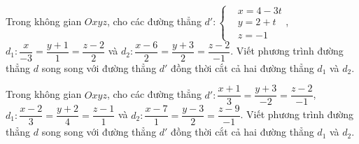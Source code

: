 \begin{bt}%
	Trong không gian $Oxyz$, cho các đường thẳng $d':\left\{\begin{aligned}&x=4-3t\\&y=2+t\\&z=-1\end{aligned}\right.$,\newline $d_1:\dfrac{x}{-3}=\dfrac{y+1}{1}=\dfrac{z-2}{2}$ và $d_2:\dfrac{x-6}{2}=\dfrac{y+3}{2}=\dfrac{z-2}{-1}$. Viết phương trình đường thẳng $d$ song song với đường thẳng $d'$ đồng thời cắt cả hai đường thẳng $d_1$ và $d_2$.
\end{bt}
\begin{bt}%
	Trong không gian $Oxyz$, cho các đường thẳng $d':\dfrac{x+1}{3}=\dfrac{y+3}{-2}=\dfrac{z-2}{-1}$,\newline $d_1:\dfrac{x-2}{3}=\dfrac{y+2}{4}=\dfrac{z-1}{1}$ và $d_2:\dfrac{x-7}{1}=\dfrac{y-3}{2}=\dfrac{z-9}{-1}$. Viết phương trình đường thẳng $d$ song song với đường thẳng $d'$ đồng thời cắt cả hai đường thẳng $d_1$ và $d_2$.
\end{bt}
